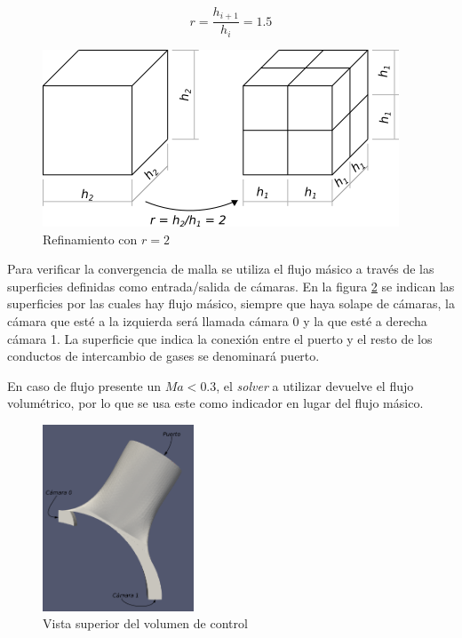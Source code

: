 \documentclass[11pt]{article}
\begin{document}
\begin{equation}
    \label{eq:r}
    r = \frac{h_{i+1}}{h_{i}} = 1.5
\end{equation}


\begin{figure}
    \centering
    \includegraphics{celdas_block_mesh.png}
    \caption{Refinamiento con $r=2$}
    \label{fig:celdas_bm}
\end{figure}

Para verificar la convergencia de malla se utiliza el flujo másico a través
de las superficies definidas como entrada/salida de cámaras.
%
En la figura \ref{fig:parches} se indican las superficies por las cuales hay
flujo másico, siempre que haya solape de cámaras, la cámara que esté a la
izquierda será llamada cámara 0 y la que esté a derecha cámara 1.
%
La superficie que indica la conexión entre el puerto y el resto de los conductos
de intercambio de gases se denominará puerto.


En caso de flujo presente un $Ma < 0.3$, el \emph{solver} a utilizar devuelve
el flujo volumétrico, por lo que se usa este como indicador en lugar del flujo
másico.

\begin{figure}
    \centering
    \includegraphics[width=0.4\textwidth]{nombres-parches.png}
    \caption{Vista superior del volumen de control}
    \label{fig:parches}
\end{figure}
\end{document}
